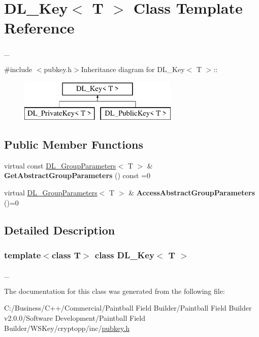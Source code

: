 \hypertarget{class_d_l___key}{
\section{DL\_\-Key$<$ T $>$ Class Template Reference}
\label{class_d_l___key}
}


\_\-  


{\ttfamily \#include $<$pubkey.h$>$}Inheritance diagram for DL\_\-Key$<$ T $>$::\begin{figure}[H]
\begin{center}
\leavevmode
\includegraphics[height=2cm]{class_d_l___key}
\end{center}
\end{figure}
\subsection*{Public Member Functions}
\begin{DoxyCompactItemize}
\item 
\hypertarget{class_d_l___key_a85e3d4eddb546c05acdca33a9939755e}{
virtual const \hyperlink{class_d_l___group_parameters}{DL\_\-GroupParameters}$<$ T $>$ \& {\bfseries GetAbstractGroupParameters} () const =0}
\label{class_d_l___key_a85e3d4eddb546c05acdca33a9939755e}

\item 
\hypertarget{class_d_l___key_aaffcc772fd8fe1d37fae92ed77c54829}{
virtual \hyperlink{class_d_l___group_parameters}{DL\_\-GroupParameters}$<$ T $>$ \& {\bfseries AccessAbstractGroupParameters} ()=0}
\label{class_d_l___key_aaffcc772fd8fe1d37fae92ed77c54829}

\end{DoxyCompactItemize}


\subsection{Detailed Description}
\subsubsection*{template$<$class T$>$ class DL\_\-Key$<$ T $>$}

\_\- 

The documentation for this class was generated from the following file:\begin{DoxyCompactItemize}
\item 
C:/Business/C++/Commercial/Paintball Field Builder/Paintball Field Builder v2.0.0/Software Development/Paintball Field Builder/WSKey/cryptopp/inc/\hyperlink{pubkey_8h}{pubkey.h}\end{DoxyCompactItemize}

